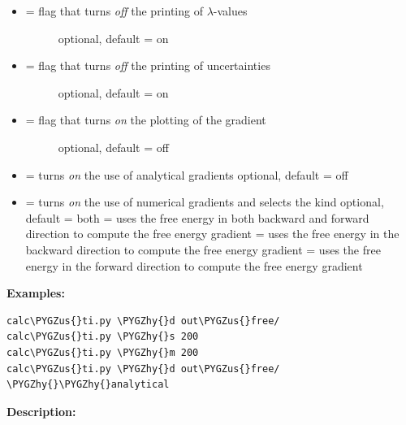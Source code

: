 \documentclass[letterpaper,10pt,english]{sphinxmanual}
\def\PYGZus{\char`\_}
\def\PYGZhy{\char`\-}
\begin{document}
\begin{itemize}
\begin{description}
\end{description}

\item {} \begin{description}
\item[{  = flag that turns \emph{off} the printing of \(\lambda\)-values}] \leavevmode
optional, default = on

\end{description}

\item {} \begin{description}
\item[{  = flag that turns \emph{off} the printing of uncertainties}] \leavevmode
optional, default = on

\end{description}

\item {} \begin{description}
\item[{  = flag that turns \emph{on} the plotting of the gradient}] \leavevmode
optional, default = off

\end{description}

\item {} 
 = turns \emph{on} the use of analytical gradients
optional, default = off

\item {} 
 = turns \emph{on} the use of numerical gradients and selects the kind
optional, default = both
 = uses the free energy in both backward and forward direction to compute the free energy gradient
 = uses the free energy in the backward direction to compute the free energy gradient
 = uses the free energy in the forward direction to compute the free energy gradient

\end{itemize}

\textbf{Examples:}

\begin{Verbatim}[commandchars=\\\{\}]
calc\PYGZus{}ti.py \PYGZhy{}d out\PYGZus{}free/
calc\PYGZus{}ti.py \PYGZhy{}s 200
calc\PYGZus{}ti.py \PYGZhy{}m 200
calc\PYGZus{}ti.py \PYGZhy{}d out\PYGZus{}free/ \PYGZhy{}\PYGZhy{}analytical
\end{Verbatim}

\textbf{Description:}
\end{document}
